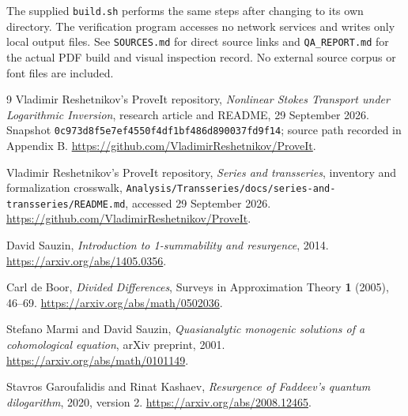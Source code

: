 \documentclass[11pt,a4paper]{article}
\numberwithin{equation}{section}
\theoremstyle{definition}
\theoremstyle{remark}
\begin{document}
The supplied \texttt{build.sh} performs the same steps after changing to
its own directory. The verification program accesses no network services
and writes only local output files. See \texttt{SOURCES.md} for direct
source links and \texttt{QA\_REPORT.md} for the actual PDF build and visual
inspection record. No external source corpus or font files are included.

\begin{thebibliography}{9}
Vladimir Reshetnikov's ProveIt repository,
\emph{Nonlinear Stokes Transport under Logarithmic Inversion},
research article and README, 29 September 2026.
Snapshot \texttt{0c973d8f5e7ef4550f4df1bf486d890037fd9f14};
source path recorded in Appendix B.
\url{https://github.com/VladimirReshetnikov/ProveIt}.

Vladimir Reshetnikov's ProveIt repository,
\emph{Series and transseries}, inventory and formalization crosswalk,
\texttt{Analysis/Transseries/docs/series-and-transseries/README.md},
accessed 29 September 2026.
\url{https://github.com/VladimirReshetnikov/ProveIt}.

David Sauzin,
\emph{Introduction to 1-summability and resurgence}, 2014.
\url{https://arxiv.org/abs/1405.0356}.

Carl de Boor,
\emph{Divided Differences},
Surveys in Approximation Theory \textbf{1} (2005), 46--69.
\url{https://arxiv.org/abs/math/0502036}.

Stefano Marmi and David Sauzin,
\emph{Quasianalytic monogenic solutions of a cohomological equation},
arXiv preprint, 2001.
\url{https://arxiv.org/abs/math/0101149}.

Stavros Garoufalidis and Rinat Kashaev,
\emph{Resurgence of Faddeev's quantum dilogarithm},
2020, version 2.
\url{https://arxiv.org/abs/2008.12465}.
\end{thebibliography}
\end{document}
